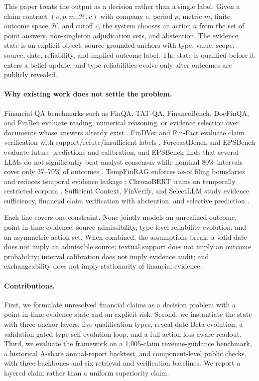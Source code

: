 \documentclass[11pt]{article}
\begin{document}
This paper treats the output as a decision rather than a single label. Given a claim contract $(e,p,m,\mathcal H,c)$ with company $e$, period $p$, metric $m$, finite outcome space $\mathcal H$, and cutoff $c$, the system chooses an action $a$ from the set of point answers, non-singleton adjudication sets, and abstention. The evidence state is an explicit object: source-grounded anchors with type, value, scope, source, date, reliability, and implied outcome label. The state is qualified before it enters a belief update, and type reliabilities evolve only after outcomes are publicly revealed.

\paragraph{Why existing work does not settle the problem.}
Financial QA benchmarks such as FinQA, TAT-QA, FinanceBench, DocFinQA, and FinBen evaluate reading, numerical reasoning, or evidence selection over documents whose answers already exist \citep{chen2021finqa,zhu2021tatqa,islam2023financebench,reddy2024docfinqa,xie2024finben}. FinDVer and Fin-Fact evaluate claim verification with support/refute/insufficient labels \citep{zhao2024findver,rangapur2025finfact}. ForecastBench and EPSBench evaluate future predictions and calibration, and EPSBench finds that several LLMs do not significantly beat analyst consensus while nominal 80\% intervals cover only 37--70\% of outcomes \citep{karger2025forecastbench,yin2026epsbench}. TempFinRAG enforces as-of filing boundaries and reduces temporal evidence leakage \citep{tao2026tempfinrag}; ChronoBERT trains on temporally restricted corpora \citep{he2026chrono}. Sufficient Context, FinVerify, and SelectLLM study evidence sufficiency, financial claim verification with abstention, and selective prediction \citep{joren2025sufficient,guan2026finverify,mao2025selectllm}.

Each line covers one constraint. None jointly models an unrealized outcome, point-in-time evidence, source admissibility, type-level reliability evolution, and an asymmetric action set. When combined, the assumptions break: a valid date does not imply an admissible source; textual support does not imply an outcome probability; interval calibration does not imply evidence audit; and exchangeability does not imply stationarity of financial evidence.

\paragraph{Contributions.}
First, we formulate unresolved financial claims as a decision problem with a point-in-time evidence state and an explicit risk. Second, we instantiate the state with three anchor layers, five qualification types, reveal-date Beta evolution, a validation-gated type self-evolution loop, and a full-action loss-aware readout. Third, we evaluate the framework on a 1,005-claim revenue-guidance benchmark, a historical A-share annual-report backtest, and component-level public checks, with three backbones and six retrieval and verification baselines. We report a layered claim rather than a uniform superiority claim.
\end{document}
